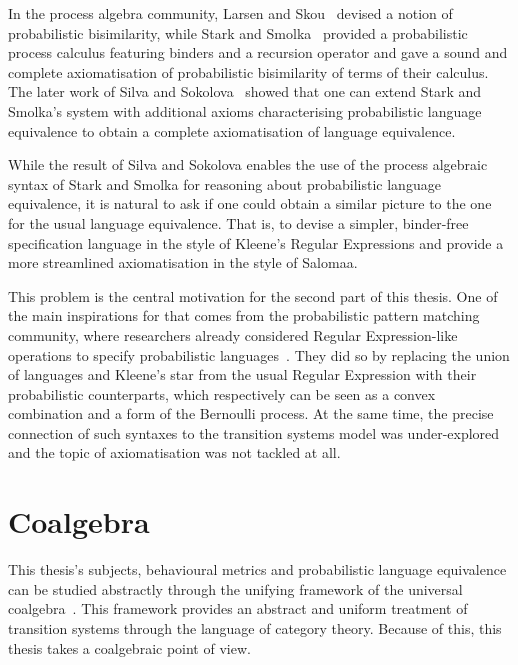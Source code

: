 In the process algebra community, Larsen and Skou~\cite{Larsen:1991:Bisimulation} devised a notion of probabilistic bisimilarity, while Stark and Smolka~\cite{Stark:2000:Complete} provided a probabilistic process calculus featuring binders and a recursion operator and gave a sound and complete axiomatisation of probabilistic bisimilarity of terms of their calculus. The later work of Silva and Sokolova~\cite{Silva:2011:Sound} showed that one can extend Stark and Smolka's system with additional axioms characterising probabilistic language equivalence to obtain a complete axiomatisation of language equivalence.

While the result of Silva and Sokolova enables the use of the process algebraic syntax of Stark and Smolka for reasoning about probabilistic language equivalence, it is natural to ask if one could obtain a similar picture to the one for the usual language equivalence. That is, to devise a simpler, binder-free specification language in the style of Kleene's Regular Expressions and provide a more streamlined axiomatisation in the style of Salomaa.
	
	This problem is the central motivation for the second part of this thesis. One of the main inspirations for that comes from the probabilistic pattern matching community, where researchers already considered Regular Expression-like operations to specify probabilistic languages~\cite{Ross:2000:Probabilistic}. They did so by replacing the union of languages and Kleene's star from the usual Regular Expression with their probabilistic counterparts, which respectively can be seen as a convex combination and a form of the Bernoulli process. At the same time, the precise connection of such syntaxes to the transition systems model was under-explored~\cite{Beeh:2017:Transformations} and the topic of axiomatisation was not tackled at all. 


\section{Coalgebra}
This thesis's subjects, behavioural metrics and probabilistic language equivalence can be studied abstractly through the unifying framework of the universal coalgebra~\cite{Gumm:2000:Elements,Rutten:2000:Universal}. This framework provides an abstract and uniform treatment of transition systems through the language of category theory. Because of this, this thesis takes a coalgebraic point of view.


